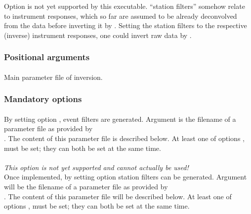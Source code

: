 Option  is not yet supported by this executable. ``station filters'' somehow relate to
instrument responses, which so far are assumed to be already deconvolved from the data
before inverting it by \ASKI{}. Setting the station filters to the respective (inverse) instrument responses,
one could invert raw data by \ASKI{}.

\subsubsection{Positional arguments}
\paragraph{}
Main parameter file of inversion.

\subsubsection{Mandatory options}
\paragraph{}
By setting option , event filters are generated. Argument
 is the filename of a parameter file as provided by \\
 . The content of this parameter file is described below.
At least one of options ,  must be set; they can both be set at the same time.

\paragraph{}
\emph{This option is not yet supported and cannot actually be used!}\\
Once implemented, by setting option  station filters can be generated. Argument
 will be the filename of a parameter file as provided by \\
 . The content of this 
parameter file will be described below.
At least one of options ,  must be set; they can both be set at the same time.

